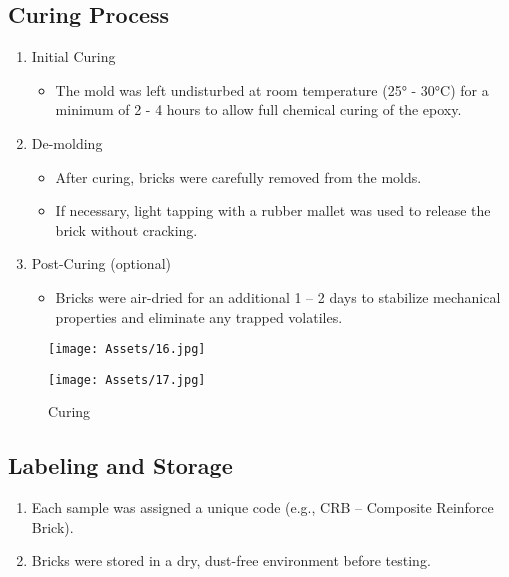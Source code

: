 \subsection{Curing Process}
\begin{enumerate}
	\item  Initial Curing
	      \begin{itemize}
		      \item  The mold was left undisturbed at room temperature (25° - 30°C) for a minimum of 2 - 4 hours to allow full chemical curing of the epoxy.
	      \end{itemize}
	\item  De-molding
	      \begin{itemize}
		      \item After curing, bricks were carefully removed from the molds.
		      \item If necessary, light tapping with a rubber mallet was used to release the brick without cracking.
	      \end{itemize}
	\item Post-Curing (optional)
	      \begin{itemize}
		      \item Bricks were air-dried for an additional 1 – 2 days to stabilize mechanical properties and eliminate any trapped volatiles.
	      \end{itemize}
\end{enumerate}

\begin{figure}[H]
	\centering
	\begin{minipage}{0.48\textwidth}
		\centering
		\texttt{[image: Assets/16.jpg]}
	\end{minipage}
	\hfill
	\begin{minipage}{0.48\textwidth}
		\centering
		\texttt{[image: Assets/17.jpg]}
	\end{minipage}
	\caption{Curing}
\end{figure}

\subsection{Labeling and Storage}
\begin{enumerate}
	\item Each sample was assigned a unique code (e.g., CRB – Composite Reinforce Brick).
	\item Bricks were stored in a dry, dust-free environment before testing.
\end{enumerate}

